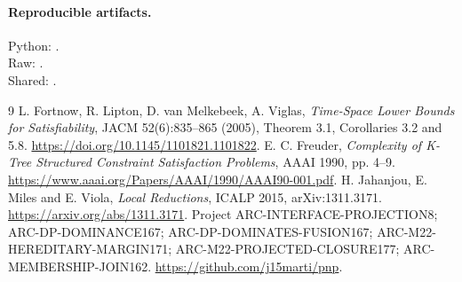 \documentclass[11pt]{article}
\begin{document}
\paragraph{Reproducible artifacts.}
Python: .\\
Raw: .\\
Shared: .
\begin{thebibliography}{9}
 L. Fortnow, R. Lipton, D. van Melkebeek, A. Viglas,
\emph{Time-Space Lower Bounds for Satisfiability}, JACM 52(6):835--865
(2005), Theorem 3.1, Corollaries 3.2 and 5.8.
\url{https://doi.org/10.1145/1101821.1101822}.
 E. C. Freuder,
\emph{Complexity of K-Tree Structured Constraint Satisfaction Problems},
AAAI 1990, pp. 4--9.
\url{https://www.aaai.org/Papers/AAAI/1990/AAAI90-001.pdf}.
 H. Jahanjou, E. Miles and E. Viola,
\emph{Local Reductions}, ICALP 2015, arXiv:1311.3171.
\url{https://arxiv.org/abs/1311.3171}.
 Project ARC-INTERFACE-PROJECTION8; ARC-DP-DOMINANCE167;
ARC-DP-DOMINATES-FUSION167; ARC-M22-HEREDITARY-MARGIN171;
ARC-M22-PROJECTED-CLOSURE177; ARC-MEMBERSHIP-JOIN162.
\url{https://github.com/j15marti/pnp}.
\end{thebibliography}
\end{document}
